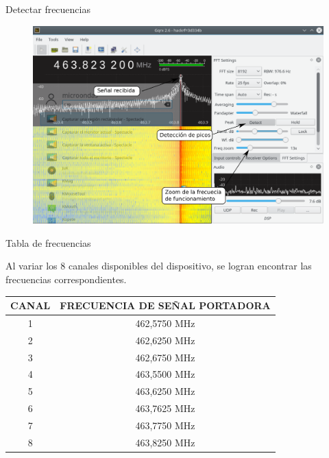\begin{frame}{Detectar frecuencias}

\begin{figure}[H]
\centering
\vspace{-3mm}
\includegraphics[width=\textwidth]{parte3/lab10/pdf/lab10_6.pdf}
\end{figure}

\end{frame}

\begin{frame}{Tabla de frecuencias}

Al variar los 8 canales disponibles del dispositivo, se logran encontrar las frecuencias correspondientes.


\begin{table}[]
\scriptsize
\centering
\begin{tabular}{|c|c|}
\hline

\rowcolor{BlueGreen!20}
\textbf{CANAL} & \textbf{FRECUENCIA DE SEÑAL PORTADORA} \\ \hline
1              & 462,5750 MHz                           \\ \hline
2              & 462,6250 MHz                           \\ \hline
3              & 462,6750 MHz                           \\ \hline
4              & 463,5500 MHz                           \\ \hline
5              & 463,6250 MHz                           \\ \hline
6              & 463,7625 MHz                           \\ \hline
7              & 463,7750 MHz                           \\ \hline
8              & 463,8250 MHz                           \\ \hline
\end{tabular}
\end{table}

\end{frame}

